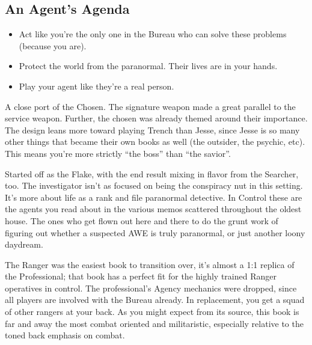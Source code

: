 \documentclass[10pt,oneside,landscape]{memoir}
\begin{document}
\begin{multicols}{3}

\begin{tcolorbox}[bottom=4mm,after skip=8mm]
\section*{An Agent's Agenda}
\begin{itemize}[parsep=3mm]

\item Act like you’re the only one in the Bureau who can solve these problems (because you are).
\item Protect the world from the paranormal.  Their lives are in your hands.
\item Play your agent like they’re a real person.

\end{itemize}
\end{tcolorbox}

{A close port of the Chosen.  The signature weapon made a great parallel to the service weapon.  Further, the chosen was already themed around their importance.  The design leans more toward playing Trench than Jesse, since Jesse is so many other things that became their own books as well (the outsider, the psychic, etc).  This means you’re more strictly “the boss” than “the savior”.}

{Started off as the Flake, with the end result mixing in flavor from the Searcher, too.  The investigator isn’t as focused on being the conspiracy nut in this setting.  It’s more about life as a rank and file paranormal detective.  In Control these are the agents you read about in the various memos scattered throughout the oldest house.  The ones who get flown out here and there to do the grunt work of figuring out whether a suspected AWE is truly paranormal, or just another loony daydream.}

{The Ranger was the easiest book to transition over, it’s almost a 1:1 replica of the Professional; that book has a perfect fit for the highly trained Ranger operatives in control.  The professional’s Agency mechanics were dropped, since all players are involved with the Bureau already.  In replacement, you get a squad of other rangers at your back.  As you might expect from its source, this book is far and away the most combat oriented and militaristic, especially relative to the toned back emphasis on combat.}


\end{multicols}
\end{document}

